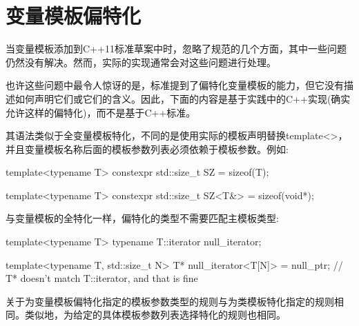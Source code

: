\section{变量模板偏特化}
当变量模板添加到C++11标准草案中时，忽略了规范的几个方面，其中一些问题仍然没有解决。然而，实际的实现通常会对这些问题进行处理。

也许这些问题中最令人惊讶的是，标准提到了偏特化变量模板的能力，但它没有描述如何声明它们或它们的含义。因此，下面的内容是基于实践中的C++实现(确实允许这样的偏特化)，而不是基于C++标准。

其语法类似于全变量模板特化，不同的是使用实际的模板声明替换template<>，并且变量模板名称后面的模板参数列表必须依赖于模板参数。例如:

\begin{cpp}
template<typename T> constexpr std::size_t SZ = sizeof(T);

template<typename T> constexpr std::size_t SZ<T&> = sizeof(void*);
\end{cpp}

与变量模板的全特化一样，偏特化的类型不需要匹配主模板类型:

\begin{cpp}
template<typename T> typename T::iterator null_iterator;

template<typename T, std::size_t N> T* null_iterator<T[N]> = null_ptr;
// T* doesn't match T::iterator, and that is fine
\end{cpp}

关于为变量模板偏特化指定的模板参数类型的规则与为类模板特化指定的规则相同。类似地，为给定的具体模板参数列表选择特化的规则也相同。




































